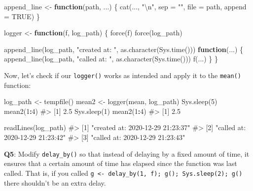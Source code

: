 \documentclass[
]{krantz}
\makeatletter
\newenvironment{Shaded}{\begin{snugshade}}{\end{snugshade}}
\newcommand{\CharTok}[1]{\textcolor[rgb]{0.31,0.60,0.02}{#1}}
\newcommand{\CommentTok}[1]{\textcolor[rgb]{0.56,0.35,0.01}{\textit{#1}}}
\newcommand{\ControlFlowTok}[1]{\textcolor[rgb]{0.13,0.29,0.53}{\textbf{#1}}}
\newcommand{\DataTypeTok}[1]{\textcolor[rgb]{0.13,0.29,0.53}{#1}}
\newcommand{\DecValTok}[1]{\textcolor[rgb]{0.00,0.00,0.81}{#1}}
\newcommand{\KeywordTok}[1]{\textcolor[rgb]{0.13,0.29,0.53}{\textbf{#1}}}
\newcommand{\NormalTok}[1]{#1}
\newcommand{\OperatorTok}[1]{\textcolor[rgb]{0.81,0.36,0.00}{\textbf{#1}}}
\newcommand{\OtherTok}[1]{\textcolor[rgb]{0.56,0.35,0.01}{#1}}
\newcommand{\StringTok}[1]{\textcolor[rgb]{0.31,0.60,0.02}{#1}}
\newenvironment{kframe}{%
\medskip{}
\setlength{\fboxsep}{.8em}
 \def\at@end@of@kframe{}%
 \ifinner\ifhmode%
  \def\at@end@of@kframe{\end{minipage}}%
  \begin{minipage}{\columnwidth}%
 \fi\fi%
 \def\FrameCommand##1{\hskip\@totalleftmargin \hskip-\fboxsep
 \colorbox{shadecolor}{##1}\hskip-\fboxsep
     \hskip-\linewidth \hskip-\@totalleftmargin \hskip\columnwidth}%
 \MakeFramed {\advance\hsize-\width
   \@totalleftmargin\z@ \linewidth\hsize
   \@setminipage}}%
 {\par\unskip\endMakeFramed%
 \at@end@of@kframe}
\renewenvironment{Shaded}{\begin{kframe}}{\end{kframe}}
\renewcommand{\KeywordTok} [1]{\textcolor[rgb]{0.00,0.44,0.13}{{#1}}}
\renewcommand{\DataTypeTok}[1]{\textcolor[rgb]{0.56,0.13,0.00}{{#1}}}
\renewcommand{\DecValTok}  [1]{\textcolor[rgb]{0.25,0.63,0.44}{{#1}}}
\renewcommand{\CharTok}    [1]{\textcolor[rgb]{0.25,0.44,0.63}{{#1}}}
\renewcommand{\StringTok}  [1]{\textcolor[rgb]{0.25,0.44,0.63}{{#1}}}
\renewcommand{\CommentTok} [1]{\textcolor[rgb]{0.38,0.63,0.69}{{#1}}}
\renewcommand{\OtherTok}   [1]{\textcolor[rgb]{0.00,0.44,0.13}{{#1}}}
\renewcommand{\NormalTok}  [1]{{#1}}
\makeatother
\begin{document}
\begin{Shaded}
\begin{Highlighting}[]
\NormalTok{append_line <-}\StringTok{ }\ControlFlowTok{function}\NormalTok{(path, ...) \{ }
  \KeywordTok{cat}\NormalTok{(..., }\StringTok{"}\CharTok{\textbackslash{}n}\StringTok{"}\NormalTok{, }\DataTypeTok{sep =} \StringTok{""}\NormalTok{, }\DataTypeTok{file =}\NormalTok{ path, }\DataTypeTok{append =} \OtherTok{TRUE}\NormalTok{)}
\NormalTok{\}}

\NormalTok{logger <-}\StringTok{ }\ControlFlowTok{function}\NormalTok{(f, log_path) \{}
  \KeywordTok{force}\NormalTok{(f)}
  \KeywordTok{force}\NormalTok{(log_path)}
  
  \KeywordTok{append_line}\NormalTok{(log_path, }\StringTok{"created at: "}\NormalTok{, }\KeywordTok{as.character}\NormalTok{(}\KeywordTok{Sys.time}\NormalTok{()))}
  \ControlFlowTok{function}\NormalTok{(...) \{}
    \KeywordTok{append_line}\NormalTok{(log_path, }\StringTok{"called at: "}\NormalTok{, }\KeywordTok{as.character}\NormalTok{(}\KeywordTok{Sys.time}\NormalTok{()))}
    \KeywordTok{f}\NormalTok{(...)}
\NormalTok{  \}}
\NormalTok{\}}
\end{Highlighting}
\end{Shaded}

Now, let's check if our \texttt{logger()} works as intended and apply it to the \texttt{mean()} function:

\begin{Shaded}
\begin{Highlighting}[]
\NormalTok{log_path <-}\StringTok{ }\KeywordTok{tempfile}\NormalTok{()}
\NormalTok{mean2 <-}\StringTok{ }\KeywordTok{logger}\NormalTok{(mean, log_path)}
\KeywordTok{Sys.sleep}\NormalTok{(}\DecValTok{5}\NormalTok{)}
\KeywordTok{mean2}\NormalTok{(}\DecValTok{1}\OperatorTok{:}\DecValTok{4}\NormalTok{) }
\CommentTok{#> [1] 2.5}
\KeywordTok{Sys.sleep}\NormalTok{(}\DecValTok{1}\NormalTok{)}
\KeywordTok{mean2}\NormalTok{(}\DecValTok{1}\OperatorTok{:}\DecValTok{4}\NormalTok{)}
\CommentTok{#> [1] 2.5}

\KeywordTok{readLines}\NormalTok{(log_path)}
\CommentTok{#> [1] "created at: 2020-12-29 21:23:37"}
\CommentTok{#> [2] "called at: 2020-12-29 21:23:42" }
\CommentTok{#> [3] "called at: 2020-12-29 21:23:43"}
\end{Highlighting}
\end{Shaded}

\textbf{{Q5}}: Modify \texttt{delay\_by()} so that instead of delaying by a fixed amount of time, it ensures that a certain amount of time has elapsed since the function was last called. That is, if you called \texttt{g\ \textless{}-\ delay\_by(1,\ f);\ g();\ Sys.sleep(2);\ g()} there shouldn't be an extra delay.
\end{document}
